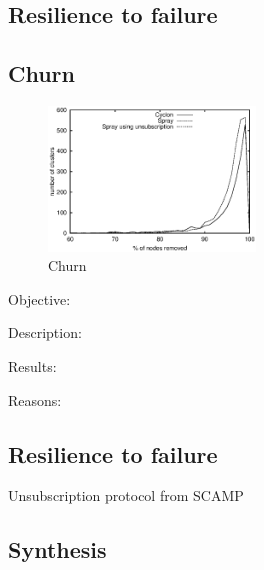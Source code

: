 \subsection{Resilience to failure}

\subsection{Churn}
\begin{figure}
    \centering
    \includegraphics[width=0.49\textwidth]{img/churn.eps}
    \caption{Churn}
    \label{fig:churn}
\end{figure}
\begin{asparadesc}

\item[Objective:] 

\item[Description:] 

\item[Results:]

\item[Reasons:]

\end{asparadesc}

\subsection{Resilience to failure}


\label{subsec:churn}




\begin{algorithm}

\caption{\label{algo:unsubscription}Unsubscription protocol from
  SCAMP~\cite{ganesh2003peer}}
\end{algorithm}

\subsection{Synthesis}

